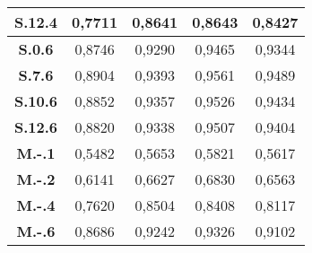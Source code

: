 \begin{apendicesenv}
\begin{table}[!htb]
\begin{tabular}{|c|c|c|c|c|}
\textbf{S.12.4} & 0,7711      & 0,8641      & 0,8643      & 0,8427      \\ \hline
\textbf{S.0.6}  & 0,8746      & 0,9290      & 0,9465      & 0,9344      \\ \hline
\textbf{S.7.6}  & 0,8904      & 0,9393      & 0,9561      & 0,9489      \\ \hline
\textbf{S.10.6} & 0,8852      & 0,9357      & 0,9526      & 0,9434      \\ \hline
\textbf{S.12.6} & 0,8820      & 0,9338      & 0,9507      & 0,9404      \\ \hline
\textbf{M.-.1}  & 0,5482      & 0,5653      & 0,5821      & 0,5617      \\ \hline
\textbf{M.-.2}  & 0,6141      & 0,6627      & 0,6830      & 0,6563      \\ \hline
\textbf{M.-.4}  & 0,7620      & 0,8504      & 0,8408      & 0,8117      \\ \hline
\textbf{M.-.6}  & 0,8686      & 0,9242      & 0,9326      & 0,9102      \\ \hline
\end{tabular}
\end{table}


\end{apendicesenv}
